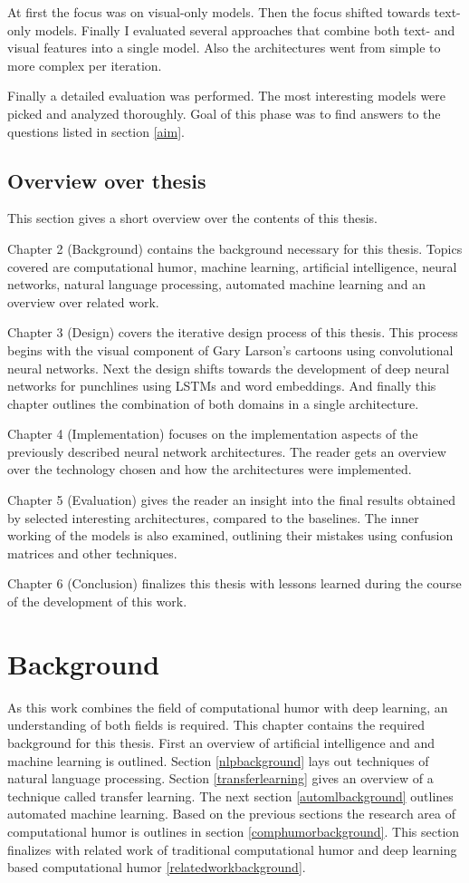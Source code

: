 \documentclass[draft,final,oneside]{vutinfth} %
\begin{document}
At first the focus was on visual-only models. Then the focus shifted towards text-only models. Finally I evaluated several approaches that combine both text- and visual features into a single model. Also the architectures went from simple to more complex per iteration.

Finally a detailed evaluation was performed. The most interesting models were picked and analyzed thoroughly. Goal of this phase was to find answers to the questions listed in section \ref{aim}.
\section{Overview over thesis}
This section gives a short overview over the contents of this thesis.

Chapter 2 (Background) contains the background necessary for this thesis. Topics covered are computational humor, machine learning, artificial intelligence, neural networks, natural language processing, automated machine learning and an overview over related work.

Chapter 3 (Design) covers the iterative design process of this thesis. This process begins with the visual component of Gary Larson's cartoons using convolutional neural networks. Next the design shifts towards the development of deep neural networks for punchlines using LSTMs and word embeddings. And finally this chapter outlines the combination of both domains in a single architecture.

Chapter 4 (Implementation) focuses on the implementation aspects of the previously described neural network architectures. The reader gets an overview over the technology chosen and how the architectures were implemented.

Chapter 5 (Evaluation) gives the reader an insight into the final results obtained by selected interesting architectures, compared to the baselines. The inner working of the models is also examined, outlining their mistakes using confusion matrices and other techniques.

Chapter 6 (Conclusion) finalizes this thesis with lessons learned during the course of the development of this work. 


\chapter{Background}

As this work combines the field of computational humor with deep learning, an understanding of both fields is required. This chapter contains the required background for this thesis. First an overview of artificial intelligence and and machine learning is outlined. Section \ref{nlpbackground} lays out techniques of natural language processing. Section \ref{transferlearning} gives an overview of a technique called transfer learning. The next section \ref{automlbackground} outlines automated machine learning. Based on the previous sections the research area of computational humor is outlines in section \ref{comphumorbackground}. This section finalizes with related work of traditional computational humor and deep learning based computational humor \ref{relatedworkbackground}.
\end{document}
